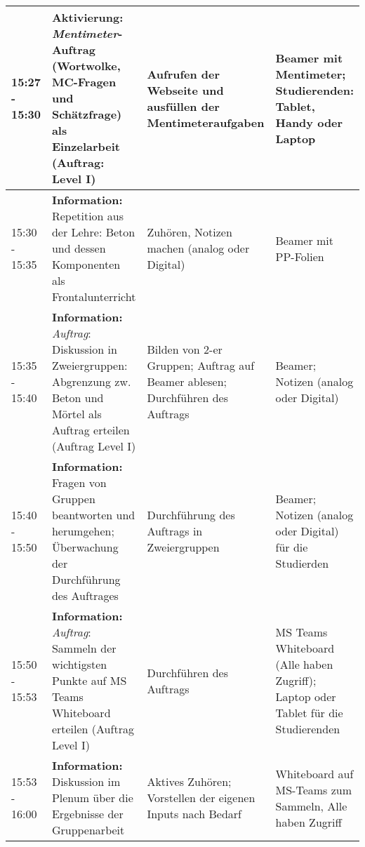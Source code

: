 \documentclass[
11pt,
captions=tableheading,
smallheadings,
headsepline,
footsepline, 
captions=tableheading,
parskip=half-,
]{scrartcl}
\begin{document}
\begin{landscape}
\begin{longtable}{@{}l|p{8.75cm}p{7.75cm}p{5.25cm}@{}}
        \midrule
        15:27 - 15:30 & \textbf{Aktivierung: } \textit{Mentimeter}-Auftrag (Wortwolke, MC-Fragen und Schätzfrage) als Einzelarbeit (Auftrag: Level I)                                            & Aufrufen der Webseite und ausfüllen der Mentimeteraufgaben                                                     & Beamer mit Mentimeter; Studierenden: Tablet, Handy oder Laptop                    \\
        \midrule
        15:30 - 15:35 & \textbf{Information: } Repetition aus der Lehre: Beton und dessen Komponenten als Frontalunterricht                                                              & Zuhören, Notizen machen (analog oder Digital)                                                                  & Beamer mit PP-Folien                                                              \\
        \midrule
        15:35 - 15:40 & \textbf{Information:} \textit{Auftrag}: Diskussion in Zweiergruppen: Abgrenzung zw. Beton und Mörtel als Auftrag erteilen (Auftrag Level I)                                       & Bilden von 2-er Gruppen; Auftrag auf Beamer ablesen; Durchführen des Auftrags                                & Beamer;  Notizen (analog oder Digital)                                            \\
        \midrule
        15:40 - 15:50 & \textbf{Information:} Fragen von Gruppen beantworten und herumgehen; Überwachung der Durchführung des Auftrages                                & Durchführung des Auftrags in Zweiergruppen                                                                                     & Beamer;  Notizen (analog oder Digital) für die Studierden                         \\
        \midrule
        15:50 - 15:53 & \textbf{Information:} \textit{Auftrag}: Sammeln der wichtigsten Punkte auf MS Teams Whiteboard erteilen   (Auftrag Level I)                                                       & Durchführen des Auftrags                                                                                       & MS Teams Whiteboard (Alle haben Zugriff); Laptop oder Tablet für die Studierenden \\
        \midrule
        15:53 - 16:00 & \textbf{Information:}  Diskussion im Plenum über die Ergebnisse der Gruppenarbeit                                                                                & Aktives Zuhören; Vorstellen der eigenen Inputs nach Bedarf                                                     & Whiteboard auf MS-Teams zum Sammeln, Alle haben Zugriff                           \\

\end{longtable}
\end{landscape}
\end{document}

